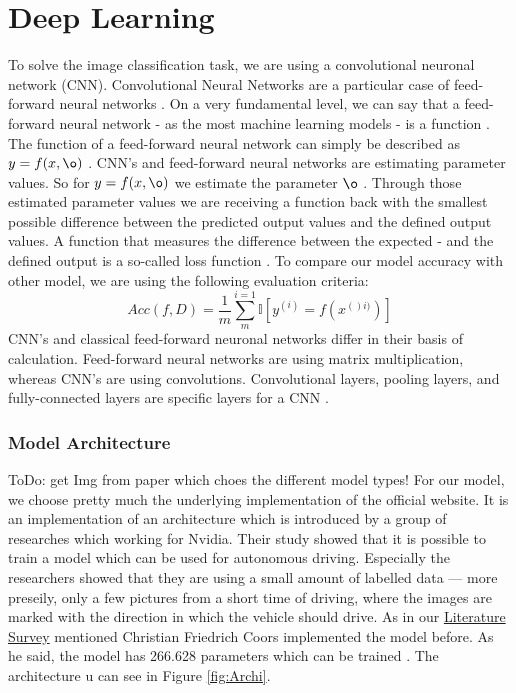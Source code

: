 \documentclass[journal]{IEEEtran}
\begin{document}
\section{Deep Learning}
\noindent To solve the image classification task, we are using a convolutional neuronal network (CNN). Convolutional Neural Networks are a particular case of feed-forward neural networks \cite{Goodfellow-et-al-2016}. On a very fundamental level, we can say that a feed-forward neural network - as the most machine learning models - is a function \cite{RN5}. The function of a feed-forward neural network can simply be described as \(y = f(x, \o )\) . CNN's and feed-forward neural networks are estimating parameter values. So for \(y = f(x, \o )\) we estimate the parameter \(\o \) \cite{Goodfellow-et-al-2016}. Through those estimated parameter values we are receiving a function back with the smallest possible difference between the predicted output values and the defined output values. A function that measures the difference between the expected - and the defined output is a so-called loss function \cite{Goodfellow-et-al-2016}. To compare our model accuracy with other model, we are using the following evaluation criteria:
\begin{equation}
Acc(f,D) = \frac{1}{m}\sum_{m}^{i=1} \mathbb{I} \left [ y^{(i)} =f(x^{()i)})\right ]
\label{acc}
\end{equation}
CNN's and classical feed-forward neuronal networks differ in their basis of calculation. Feed-forward neural networks are using matrix multiplication, whereas CNN's are using convolutions. Convolutional layers, pooling layers, and fully-connected layers are specific layers for a CNN \cite{LeCun1998}. \\

\subsubsection{Model Architecture}
\label{subsec:ModelArchitecture}
ToDo: get Img from paper which choes the different model types!
For our model, we choose pretty much the underlying implementation of the official website. It is an implementation of an architecture which is introduced by a group of researches which working for Nvidia. Their study showed that it is possible to train a model which can be used for autonomous driving. Especially the researchers showed that they are using a small amount of labelled data — more preseily,   only a few pictures from a short time of driving, where the images are marked with the direction in which the vehicle should drive\cite{LearningForSelf-DrivingCars}. As in our \hyperref[sec:LiteratureSurvey]{Literature Survey} mentioned Christian Friedrich Coors implemented the model before.  As he said, the model has 266.628 parameters which can be trained \cite{Coors}. The architecture u can see in Figure \ref{fig:Archi}.
\end{document}

